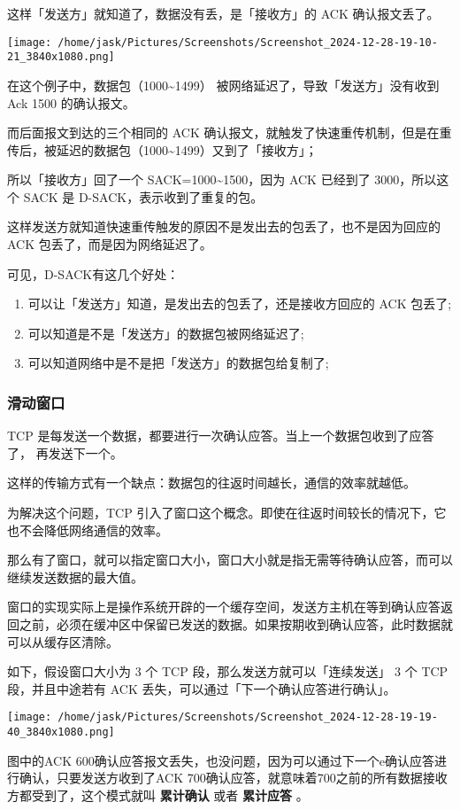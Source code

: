 \documentclass[11pt]{article}
\begin{document}
\begin{enumerate}
这样「发送方」就知道了，数据没有丢，是「接收方」的 ACK 确认报文丢了。

\begin{center}
\texttt{[image: /home/jask/Pictures/Screenshots/Screenshot\_2024-12-28-19-10-21\_3840x1080.png]}
\end{center}
在这个例子中，数据包（1000\textasciitilde{}1499） 被网络延迟了，导致「发送方」没有收到 Ack 1500 的确认报文。

而后面报文到达的三个相同的 ACK 确认报文，就触发了快速重传机制，但是在重传后，被延迟的数据包（1000\textasciitilde{}1499）又到了「接收方」；

所以「接收方」回了一个 SACK=1000\textasciitilde{}1500，因为 ACK 已经到了 3000，所以这个 SACK 是 D-SACK，表示收到了重复的包。

这样发送方就知道快速重传触发的原因不是发出去的包丢了，也不是因为回应的 ACK 包丢了，而是因为网络延迟了。

可见，D-SACK有这几个好处：

\begin{enumerate}
\item 可以让「发送方」知道，是发出去的包丢了，还是接收方回应的 ACK 包丢了;

\item 可以知道是不是「发送方」的数据包被网络延迟了;

\item 可以知道网络中是不是把「发送方」的数据包给复制了;
\end{enumerate}
\end{enumerate}
\subsubsection{滑动窗口}
\label{sec:org5fe1cff}
TCP 是每发送一个数据，都要进行一次确认应答。当上一个数据包收到了应答了， 再发送下一个。

这样的传输方式有一个缺点：数据包的往返时间越长，通信的效率就越低。

为解决这个问题，TCP 引入了窗口这个概念。即使在往返时间较长的情况下，它也不会降低网络通信的效率。

那么有了窗口，就可以指定窗口大小，窗口大小就是指无需等待确认应答，而可以继续发送数据的最大值。

窗口的实现实际上是操作系统开辟的一个缓存空间，发送方主机在等到确认应答返回之前，必须在缓冲区中保留已发送的数据。如果按期收到确认应答，此时数据就可以从缓存区清除。

如下，假设窗口大小为 3 个 TCP 段，那么发送方就可以「连续发送」 3 个 TCP 段，并且中途若有 ACK 丢失，可以通过「下一个确认应答进行确认」。
\begin{center}
\texttt{[image: /home/jask/Pictures/Screenshots/Screenshot\_2024-12-28-19-19-40\_3840x1080.png]}
\end{center}
图中的ACK 600确认应答报文丢失，也没问题，因为可以通过下一个e确认应答进行确认，只要发送方收到了ACK 700确认应答，就意味着700之前的所有数据接收方都受到了，这个模式就叫 \textbf{累计确认} 或者 \textbf{累计应答} 。
\end{document}
